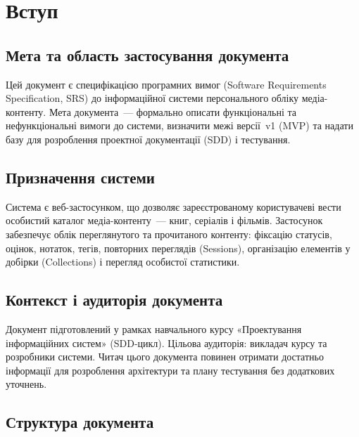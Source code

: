 \section{Вступ}

\subsection{Мета та область застосування документа}

Цей документ є специфікацією програмних вимог (Software Requirements Specification, SRS) до інформаційної системи персонального обліку медіа-контенту. Мета документа~--- формально описати функціональні та нефункціональні вимоги до системи, визначити межі версії~v1 (MVP) та надати базу для розроблення проектної документації (SDD) і тестування. 

\subsection{Призначення системи}

Система є веб-застосунком, що дозволяє зареєстрованому користувачеві вести особистий каталог медіа-контенту~--- книг, серіалів і фільмів. Застосунок забезпечує облік переглянутого та прочитаного контенту: фіксацію статусів, оцінок, нотаток, тегів, повторних переглядів (Sessions), організацію елементів у добірки (Collections) і перегляд особистої статистики. 

\subsection{Контекст і аудиторія документа}

Документ підготовлений у рамках навчального курсу «Проектування інформаційних систем» (SDD-цикл). Цільова аудиторія: викладач курсу та розробники системи. Читач цього документа повинен отримати достатньо інформації для розроблення архітектури та плану тестування без додаткових уточнень. 

\subsection{Структура документа}

